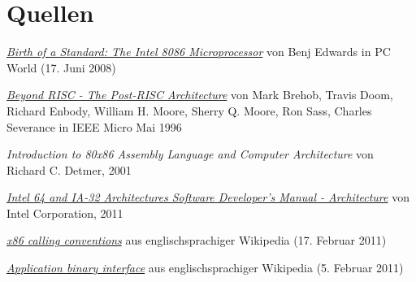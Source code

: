 \section{Quellen}

\begin{thebibliography}{9}

  \href{http://www.pcworld.com/article/146957/birth_of_a_standard_the_intel_8086_microprocessor.html}{
  \emph{Birth of a Standard: The Intel 8086 Microprocessor}}
	von Benj Edwards
	in PC World (17. Juni 2008)
	

	\href{http://www.cse.msu.edu/~enbody/postrisc/postrisc2.htm}{\emph{Beyond RISC - The Post-RISC Architecture}}
	von Mark Brehob, Travis Doom, Richard Enbody, William H. Moore, Sherry Q. Moore, Ron Sass, Charles Severance
	in IEEE Micro Mai 1996

	\emph{Introduction to 80x86 Assembly Language and Computer Architecture}
	von Richard C. Detmer,
	2001

	\href{http://www.intel.com/Assets/PDF/manual/253665.pdf}{
	\emph{Intel 64 and IA-32 Architectures Software Developer's Manual - Architecture}}
	von Intel Corporation,
	2011

	\href{https://secure.wikimedia.org/wikipedia/en/w/index.php?title=X86_calling_conventions&oldid=414385219}{\emph{x86 calling conventions}} aus englischsprachiger Wikipedia (17. Februar 2011)

	\href{https://secure.wikimedia.org/wikipedia/en/w/index.php?title=Application_binary_interface&oldid=412119478}{\emph{Application binary interface}} aus englischsprachiger Wikipedia (5. Februar 2011)

\end{thebibliography}
